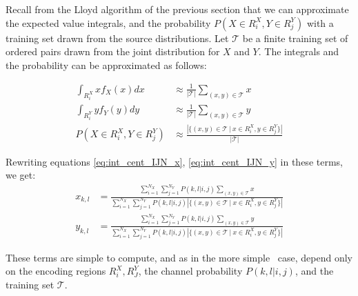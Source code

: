 Recall from the Lloyd algorithm of the previous section that we can approximate the expected value integrals, and the probability $P(X\in R_i^X, Y\in R_j^Y)$ with a training set drawn from the source distributions. Let $\mathcal T$ be a finite training set of ordered pairs drawn from the joint distribution for $X$ and $Y$. The integrals and the probability can be approximated as follows:

\begin{align}
    \int_{R_i^X}xf_X(x)dx&\approx
        \frac{1}{|\mathcal T|}\sum_{(x,y)\in \mathcal T}x\\
    \int_{R_i^Y}yf_Y(y)dy&\approx
        \frac{1}{|\mathcal T|}\sum_{(x,y)\in \mathcal T}y\\
    P(X\in R_i^X, Y\in R_j^Y)&\approx 
        \frac{\left|\{(x,y)\in \mathcal T\ |\ x\in R_i^X, y\in R_j^Y\}\right|
        }{
        |\mathcal T|
        }
\end{align}

Rewriting equations \eqref{eq:int_cent_IJN_x}, \eqref{eq:int_cent_IJN_y} in these terms, we get:
\begin{align}
    \label{eq:comp_cent_IJN_x}
    x_{k,l}
    &= \frac{
        \sum_{i=1}^{N_X}\sum_{j=1}^{N_Y}
            P(k,l|i,j)\sum_{(x,y)\in \mathcal T}x
    }{
        \sum_{i=1}^{N_X}\sum_{j=1}^{N_Y}
            P(k,l|i,j)
            \left|\{(x,y)\in \mathcal T\ |\ x\in R_i^X, y\in R_j^Y\}\right|
    }\\
    \label{eq:comp_cent_IJN_y}
    y_{k,l}
    &= \frac{
        \sum_{i=1}^{N_X}\sum_{j=1}^{N_Y}
            P(k,l|i,j)\sum_{(x,y)\in \mathcal T}y
    }{
        \sum_{i=1}^{N_X}\sum_{j=1}^{N_Y}
            P(k,l|i,j)
            \left|\{(x,y)\in \mathcal T\ |\ x\in R_i^X, y\in R_j^Y\}\right|
    }
\end{align}

These terms are simple to compute, and as in the more simple \sysJJN\ case, depend only on the encoding regions $R_i^X, R_J^Y$, the channel probability $P(k,l|i,j)$, and the training set $\mathcal T$.


